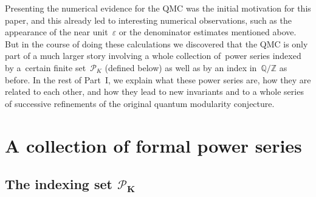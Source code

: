\documentclass[pdftex]{sigma}
\numberwithin{equation}{section}
\def\BZ{\mathbb Z}
\def\BQ{\mathbb Q}
\def\calP{\mathcal P}
\def\calP{\mathcal P}
\def\a{\alpha}
\def\Z{\mathbb Z}
\def\Q{\mathbb Q}
\def\a{\alpha}
\def\s{\sigma}
\def\ve{\varepsilon}
\begin{document}
Presenting the numerical evidence for the QMC was the initial motivation
for this paper, and this already led to interesting numerical observations,
such as the appearance of the near unit~$\ve$ or the denominator estimates
mentioned above.
But in the course of doing these calculations we discovered that the QMC
is only part of a much larger story involving a whole collection of~power
series \smash{$\big\{\Phi^{(K,\s)}_\a(\hbar)\big\}_{\a \in \BQ/\BZ, \s\in\calP_K}$} indexed by a~certain finite set~$\calP_K$ (defined below) as well as by an index
in~$\Q/\Z$ as before. In the rest of Part~I, we explain what
these power series are, how they are related to each other, and how they
lead to new invariants and to a whole series of successive refinements of
the original quantum modularity conjecture.

\section{A collection of formal power series}
\label{sec.Phi}

\subsection[The indexing set P\_K]{The indexing set $\boldsymbol{\calP_K}$}
\label{sub.p}
\end{document}
